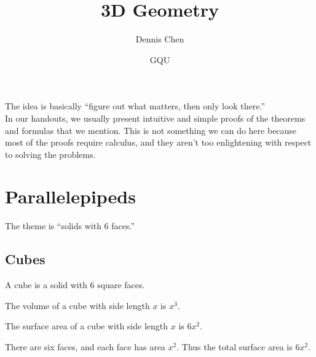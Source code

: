 \documentclass[mast]{lucky}
\title{3D Geometry}
\author{Dennis Chen}
\date{GQU}
\begin{document}
\maketitle

The idea is basically “figure out what matters, then only look there.” 
\\
In our handouts, we usually present intuitive and simple proofs of the theorems and formulas that we mention. This is not something we can do here because most of the proofs require calculus, and they aren't too enlightening with respect to solving the problems.

\section{Parallelepipeds}
The theme is “solids with $6$ faces.” 
\subsection{Cubes}

\begin{defi}[Cube]
A cube is a solid with $6$ square faces.
\end{defi}

\begin{theo}
The volume of a cube with side length $x$ is $x^3.$
\end{theo}

\begin{theo}
The surface area of a cube with side length $x$ is $6x^2.$
\end{theo}

\begin{pro}
There are six faces, and each face has area $x^2.$ Thus the total surface area is $6x^2.$
\end{pro}

\begin{center}
\end{center}
\end{document}
